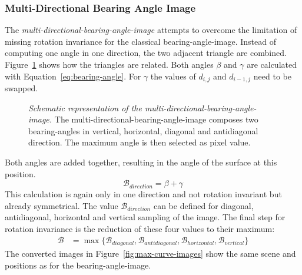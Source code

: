 \subsubsection{Multi-Directional Bearing Angle Image}

The \emph{\gls{multi-directional-bearing-angle-image}} attempts to overcome the limitation of missing rotation invariance for the classical \gls{bearing-angle-image}.
Instead of computing one angle in one direction, the two adjacent triangle are combined.
Figure~\ref{fig:max-curve} shows how the triangles are related.
Both angles $\beta$ and $\gamma$ are calculated with Equation~\ref{eq:bearing-angle}.
For $\gamma$ the values of $d_{i,j}$ and $d_{i-1,j}$ need to be swapped.
\begin{figure}
    \scalebox{0.9}{%
    
    }
    \caption[Schematic representation of the \gls{multi-directional-bearing-angle-image}]{\emph{Schematic representation of the \gls{multi-directional-bearing-angle-image}.} The \gls{multi-directional-bearing-angle-image} composes two \Glspl{bearing-angle} in vertical, horizontal, diagonal and antidiagonal direction. The maximum angle is then selected as pixel value.}\label{fig:max-curve}
\end{figure}
Both angles are added together, resulting in the angle of the surface at this position.
\begin{equation}
    \mathcal{B_{\textit{direction}}}= \beta + \gamma
\end{equation}
This calculation is again only in one direction and not rotation invariant but already symmetrical.
The value $\mathcal{B_{\textit{direction}}}$ can be defined for diagonal, antidiagonal, horizontal and vertical sampling of the image.
The final step for rotation invariance is the reduction of these four values to their maximum:
\vspace{-2mm}
\begin{align}
    \mathcal{B} &= \max{\{\mathcal{B}_{diagonal}, \mathcal{B}_{antidiagonal}, \mathcal{B}_{horizontal}, \mathcal{B}_{vertical}\}}
\end{align}
The converted images in Figure~\ref{fig:max-curve-images} show the same scene and positions as for the \gls{bearing-angle-image}.
